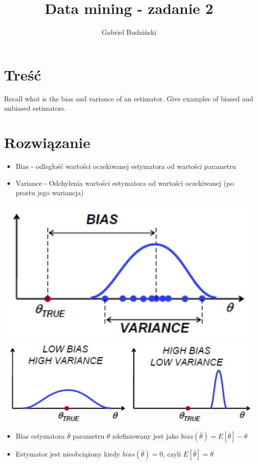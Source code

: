 \documentclass{article}
\title{Data mining - zadanie 2}
\author{Gabriel Budziński}
\begin{document}
\maketitle

\section{Treść}
Recall what is the bias and variance of an estimator. Give examples of biased and unbiased
estimators.

\section{Rozwiązanie}

\begin{itemize}
    \item Bias - odległość wartości oczekiwanej estymatora od wartości parametru
    \item Variance - Odchylenia wartości estymatora od wartości oczekiwanej (po prostu jego wariancja)
\end{itemize}

\includegraphics[scale=0.5]{b&v.png}
\includegraphics[scale=0.5]{b&v_tradeoff.png}
\\
\begin{itemize}
    \item Bias estymatora $\bar{\theta}$ parametru $\theta$ zdefiniowany jest jako $bias(\bar{\theta}) = E[\bar{\theta}] - \theta$
    \item Estymator jest nieobciążony kiedy $bias(\bar{\theta}) = 0$, czyli $E[\bar{\theta}] = \theta$
\end{itemize}
\end{document}
